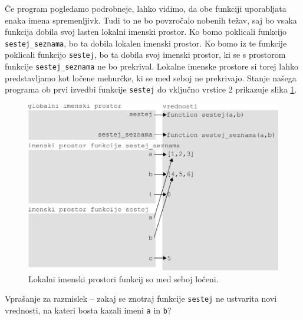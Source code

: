 Če program pogledamo podrobneje, lahko vidimo, da obe funkciji uporabljata enaka imena spremenljivk. Tudi to ne bo povzročalo nobenih težav, saj bo vsaka funkcija dobila svoj lasten lokalni imenski prostor. Ko bomo poklicali funkcijo \texttt{sestej\_seznama}, bo ta dobila lokalen imenski prostor. Ko bomo iz te funkcije poklicali funkcijo \texttt{sestej}, bo ta dobila svoj imenski prostor, ki se s prostorom funkcije \texttt{sestej\_seznama} ne bo prekrival. Lokalne imenske prostore si torej lahko predstavljamo kot ločene mehurčke, ki se med seboj ne prekrivajo. Stanje našega programa ob prvi izvedbi funkcije \texttt{sestej} do vključno vrstice 2 prikazuje slika \ref{img:imenski_prostor_8}.
\begin{figure}
    \centering
    \includegraphics[width=\linewidth]{img/imenski_prostor_8.pdf}
    \caption{Lokalni imenski prostori funkcij so med seboj ločeni.}
    \label{img:imenski_prostor_8}
\end{figure}

Vprašanje za razmislek -- zakaj se znotraj funkcije \texttt{sestej} ne ustvarita novi vrednosti, na kateri bosta kazali imeni \texttt{a} in \texttt{b}?

